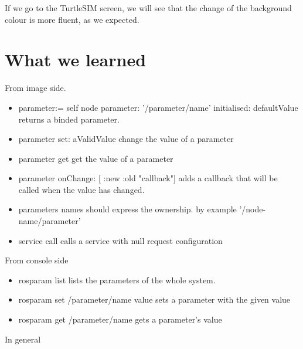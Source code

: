 \documentclass[a4paper,10pt,twoside]{book}
\begin{document}
			
		If we go to the TurtleSIM screen, we will see that the change of the background colour is more fluent, as we expected.
			
			
		\section{What we learned}
			
			
			
			From image side. 
			
			
			\begin{itemize}
				\item parameter:= self node parameter: '/parameter/name' initialised: defaultValue 
				\newline \-\- returns a binded parameter.
				\item parameter set: aValidValue 
				\newline \-\- change the value of a parameter
				\item parameter get
				\newline \-\- get the value of a parameter
				\item parameter onChange: [ :new :old \textpipe "callback"]
				\newline \-\- adds a callback that will be called when the value has changed.
				\item parameters names should express the ownership.
				\newline \-\- by example '/node-name/parameter'
				\item service call
				\newline \-\- calls a service with null request configuration
			\end{itemize}
			
			
			
			From console side 
		
			\begin{itemize}
				\item rosparam list
				\newline \-\- lists the parameters of the whole system.
				\item rosparam set /parameter/name value
				\newline \-\- sets a parameter with the given value
				\item rosparam get /parameter/name
				\newline \-\- gets a parameter's value
			\end{itemize}
		
		
			In general 
			
\end{document}
